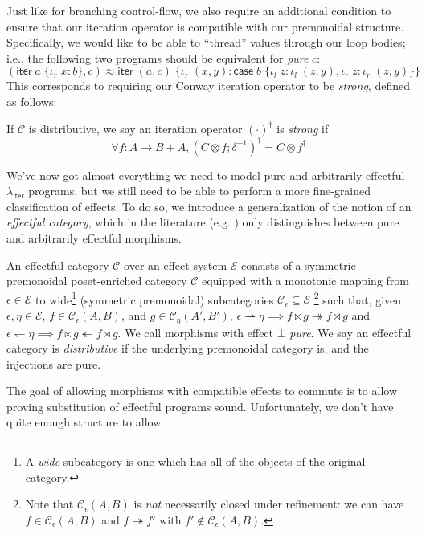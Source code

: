 \documentclass[acmsmall,screen,review]{acmart}
\newcommand{\mc}[1]{\ensuremath{\mathcal{#1}}}
\newcommand{\ms}[1]{\ensuremath{\mathsf{#1}}}
\newcommand{\lto}{:}
\newcommand{\linl}[1]{\iota_l\;{#1}}
\newcommand{\linr}[1]{\iota_r\;{#1}}
\newcommand{\caseexpr}[5]{\ms{case}\;#1\;\{\linl{#2} \lto #3, \linr{#4} \lto #5\}}
\newcommand{\liter}[3]{\ms{iter}\;#1\;\{ \linr{#2} \lto #3 \}}
\newcommand{\cref}{\twoheadrightarrow}
\newcommand{\anticref}{\twoheadleftarrow}
\newcommand{\subiterexp}{\texorpdfstring{\(\lambda_{\ms{iter}}\)}{lambda-iter}}
\newcommand{\rightmove}{\rightharpoonup}
\newcommand{\leftmove}{\leftharpoondown}
\begin{document}
Just like for branching control-flow, we also require an additional condition to ensure that our
iteration operator is compatible with our premonoidal structure. Specifically, we would like to be
able to ``thread'' values through our loop bodies; i.e., the following two programs should be
equivalent for \emph{pure} $c$:
$$
(\liter{a}{x}{b}, c) \approx \liter{(a, c)}{(x, y)}
  {\caseexpr{b}{z}{\linl{(z, y)}}{z}{\linr{(z, y)}}}
$$
This corresponds to requiring our Conway iteration operator to be \emph{strong}, defined as follows:
\begin{definition}
  If $\mc{C}$ is distributive, we say an iteration operator $(\cdot)^\dagger$ is \emph{strong} if
  $$
  \forall f: A \to B + A, (C \otimes f ; \delta^{-1})^\dagger = C \otimes f^\dagger
  $$
\end{definition}
We've now got almost everything we need to model pure and arbitrarily effectful \subiterexp{}
programs, but we still need to be able to perform a more fine-grained classification of effects. To
do so, we introduce a generalization of the notion of an \emph{effectful category}, which in the
literature (e.g. \cite{promonad}) only distinguishes between pure and arbitrarily effectful
morphisms.
\begin{definition}
  An effectful category $\mc{C}$ over an effect system $\mc{E}$ consists of a symmetric premonoidal
  poset-enriched category $\mc{C}$ equipped with a  monotonic mapping from $\epsilon \in \mc{E}$ to
  wide\footnote{A \emph{wide} subcategory is one which has all of the objects of the original
  category.} (symmetric premonoidal) subcategories $\mc{C}_\epsilon \subseteq \mc{E}$ 
  \footnote{
    Note that $\mc{C}_\epsilon(A, B)$ is \emph{not} necessarily closed under refinement:
    we can have $f \in \mc{C}_\epsilon(A, B)$ and $f \cref f'$ with 
    $f' \notin \mc{C}_\epsilon(A, B)$.
  }
  such that,
  given $\epsilon, \eta \in \mc{E}$, $f \in \mc{C}_\epsilon(A, B)$, and $g \in \mc{C}_\eta(A', B')$,
  $\epsilon \rightmove \eta \implies f \ltimes g \cref f \rtimes g$
  and
  $\epsilon \leftmove \eta \implies f \ltimes g \anticref f \rtimes g$.
  We call morphisms with effect $\bot$ \emph{pure}. We say an effectful category is
  \emph{distributive} if the underlying premonoidal category is, and the injections are pure.
\end{definition}
The goal of allowing morphisms with compatible effects to commute is to allow proving substitution
of effectful programs sound. Unfortunately, we don't have quite enough structure to allow
\end{document}
